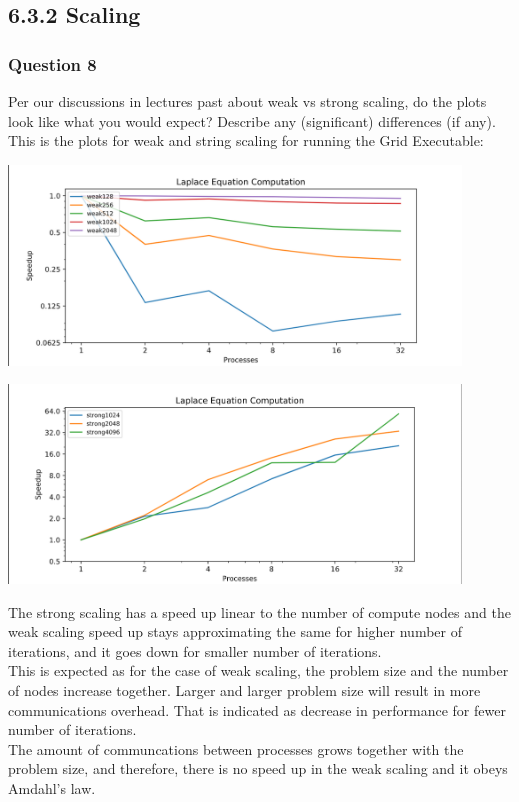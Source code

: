 \documentclass[]{article}
\begin{document}
    \subsection*{6.3.2 Scaling}
        \subsubsection*{Question 8}
            Per our discussions in lectures past about weak vs strong scaling, do the plots look like what you would expect? Describe any (significant) differences (if any). 
            \\[1.1em]
            This is the plots for weak and string scaling for running the Grid Executable: 
            \begin{center}
                \includegraphics*[width=12cm]{grid_weak.png}
            \end{center}
            \begin{center}
                \includegraphics*[width=12cm]{grid_strong.png}
            \end{center}
            The strong scaling has a speed up linear to the number of compute nodes and the weak scaling speed up stays approximating the same for higher number of iterations, and it goes down for smaller number of iterations. 
            \\[1.1em]
            This is expected as for the case of weak scaling, the problem size and the number of nodes increase together. Larger and larger problem size will result in more communications overhead. That is indicated as decrease in performance for fewer number of iterations. 
            \\[1.1em]
            The amount of communcations between processes grows together with the problem size, and therefore, there is no speed up in the weak scaling and it obeys Amdahl's law. 
\end{document}
